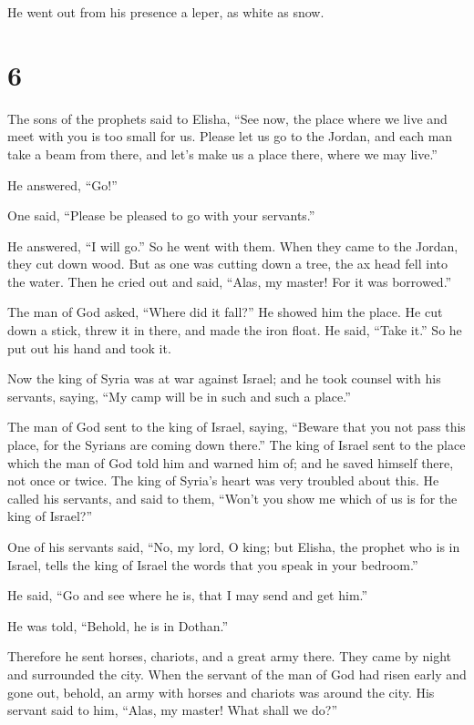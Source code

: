He went out from his presence a leper, as white as snow.

\hypertarget{section-5}{%
\section{6}\label{section-5}}

 The sons of the prophets said to Elisha, ``See now, the
place where we live and meet with you is too small for us.
 Please let us go to the Jordan, and each man take a beam
from there, and let's make us a place there, where we may live.''

He answered, ``Go!''

 One said, ``Please be pleased to go with your servants.''

He answered, ``I will go.''  So he went with them. When
they came to the Jordan, they cut down wood.  But as one
was cutting down a tree, the ax head fell into the water. Then he cried
out and said, ``Alas, my master! For it was borrowed.''

 The man of God asked, ``Where did it fall?'' He showed
him the place. He cut down a stick, threw it in there, and made the iron
float.  He said, ``Take it.'' So he put out his hand and
took it.

 Now the king of Syria was at war against Israel; and he
took counsel with his servants, saying, ``My camp will be in such and
such a place.''

 The man of God sent to the king of Israel, saying,
``Beware that you not pass this place, for the Syrians are coming down
there.''  The king of Israel sent to the place which the
man of God told him and warned him of; and he saved himself there, not
once or twice.  The king of Syria's heart was very
troubled about this. He called his servants, and said to them, ``Won't
you show me which of us is for the king of Israel?''

 One of his servants said, ``No, my lord, O king; but
Elisha, the prophet who is in Israel, tells the king of Israel the words
that you speak in your bedroom.''

 He said, ``Go and see where he is, that I may send and
get him.''

He was told, ``Behold, he is in Dothan.''

 Therefore he sent horses, chariots, and a great army
there. They came by night and surrounded the city.  When
the servant of the man of God had risen early and gone out, behold, an
army with horses and chariots was around the city. His servant said to
him, ``Alas, my master! What shall we do?''

